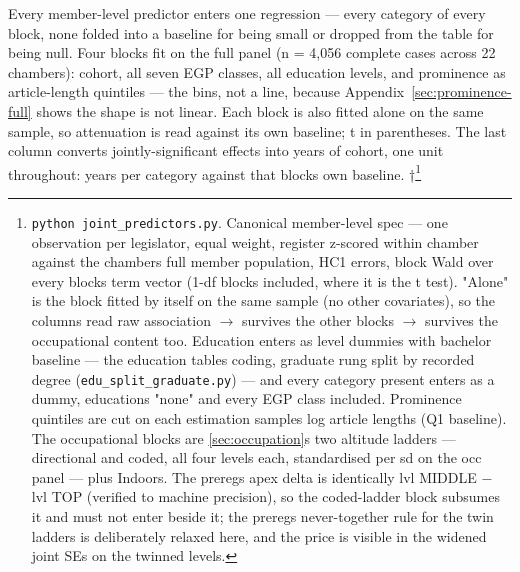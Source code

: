 Every member-level predictor enters one regression --- every category of every
block, none folded into a baseline for being small or dropped from the table
for being null. Four blocks fit on the full panel (n = 4,056 complete cases
across 22 chambers): cohort, all seven EGP classes, all education levels,
and prominence as article-length quintiles --- the bins, not a line, because
Appendix~\ref{sec:prominence-full} shows the shape is not linear. Each block is also fitted alone
on the same sample, so attenuation is read against its own baseline; t in
parentheses. The last column converts jointly-significant effects into years
of cohort, one unit throughout: years per category against that block\textquotesingle s own
baseline. †\footnote{\texttt{python\ joint\_\allowbreak{}predictors.\allowbreak{}py}. Canonical member-level spec --- one
  observation per legislator, equal weight, register z-scored within chamber
  against the chamber\textquotesingle s full member population, HC1 errors, block Wald over
  every block\textquotesingle s term vector (1-df blocks included, where it is the t test).
  "Alone" is the block fitted by itself on the same sample (no other
  covariates), so the columns read raw association \(\rightarrow\) survives the other
  blocks \(\rightarrow\) survives the occupational content too. Education enters as
  level dummies with bachelor baseline --- the education table\textquotesingle s coding,
  graduate rung split by recorded degree (\texttt{edu\_split\_graduate.py}) ---
  and every category present enters as a dummy, education\textquotesingle s "none" and
  every EGP class included. Prominence quintiles are cut on each estimation sample\textquotesingle s log article
  lengths (Q1 baseline). The occupational blocks are \cref{sec:occupation}\textquotesingle s two altitude
  ladders --- directional and coded, all four levels each, standardised per
  sd on the occ panel --- plus Indoors. The prereg\textquotesingle s apex delta is
  identically lvl MIDDLE \(-\) lvl TOP (verified to machine precision), so the
  coded-ladder block subsumes it and must not enter beside it; the
  prereg\textquotesingle s never-together rule for the twin ladders is deliberately
  relaxed here, and the price is visible in the widened joint SEs on the
  twinned levels.}

